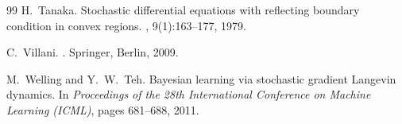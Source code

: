\documentclass[amsfonts, reqno]{amsart}
\theoremstyle{definition}
\theoremstyle{remark}
\numberwithin{equation}{section}
\begin{document}
\begin{thebibliography}{99}
H.~Tanaka.
\newblock Stochastic differential equations with reflecting boundary condition in convex regions.
, 9(1):163--177, 1979.

C.~Villani.
.
\newblock Springer, Berlin, 2009.

M.~Welling and Y.~W.~Teh.
\newblock Bayesian learning via stochastic gradient Langevin dynamics.
\newblock In {\em Proceedings of the 28th International Conference on Machine Learning (ICML)}, pages 681--688, 2011.

\end{thebibliography}
\end{document}
